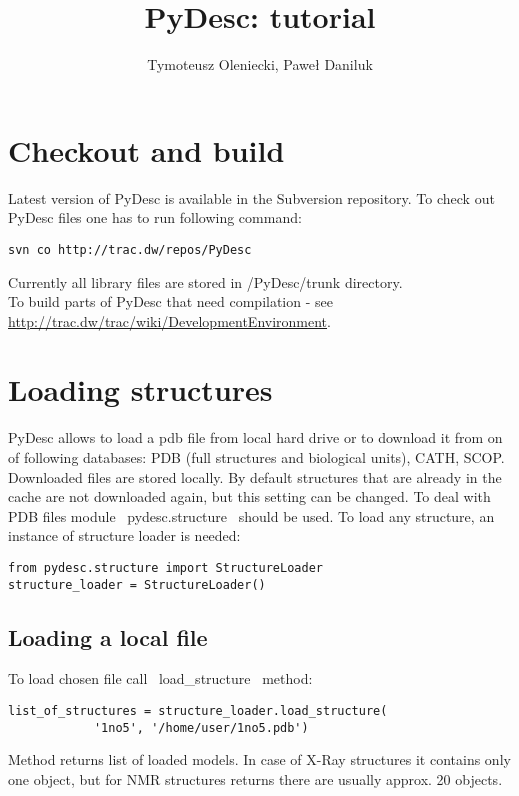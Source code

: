 \documentclass[a4paper,10pt]{article}
\title{PyDesc: tutorial}
\author{Tymoteusz Oleniecki, Paweł Daniluk}
\begin{document}
\maketitle

\section{Checkout and build}

Latest version of PyDesc is available in the Subversion repository. To check out PyDesc files one has to run following command:
\begin{lstlisting}
svn co http://trac.dw/repos/PyDesc
\end{lstlisting}

Currently all library files are stored in /PyDesc/trunk directory.
\\
To build parts of PyDesc that need compilation - see \url{http://trac.dw/trac/wiki/DevelopmentEnvironment}.

\section{Loading structures}

PyDesc allows to load a pdb file from local hard drive or to download it from on of following databases: PDB (full structures and biological units), CATH, SCOP. Downloaded files are stored locally. By default structures that are already in the cache are not downloaded again, but this setting can be changed.
To deal with PDB files module ~pydesc.structure~ should be used. To load any structure, an instance of structure loader is needed:
\begin{lstlisting}
from pydesc.structure import StructureLoader
structure_loader = StructureLoader()
\end{lstlisting}

\subsection{Loading a local file}

To load chosen file call ~load_structure~ method:
\begin{lstlisting}
list_of_structures = structure_loader.load_structure(
			'1no5', '/home/user/1no5.pdb')
\end{lstlisting}
Method returns list of loaded models. In case of X-Ray structures it contains only one object, but for NMR structures returns there are usually approx. 20 objects. 
\end{document}
